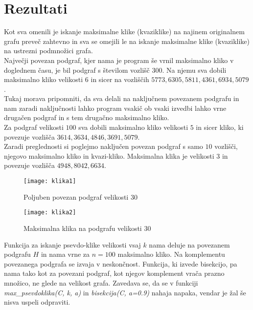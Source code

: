\documentclass[12pt,a4paper]{amsart}
\theoremstyle{definition}
\theoremstyle{plain}
\begin{document}
\section{Rezultati}

Kot sva omenili je iskanje maksimalne klike (kvaziklike) na najinem originalnem grafu preveč zahtevno in sva se omejili le na iskanje maksimalne klike (kvaziklike) na ustrezni podmnožici grafa.\\

Največji povezan podgraf, kjer nama je program še vrnil maksimalno kliko v doglednem času, je bil podgraf s številom vozlišč $300$. Na njemu sva dobili maksimalno kliko velikosti $6$ in sicer na vozliščih $5773, 6305, 5811, 4361, 6934, 5079$ .\\

Tukaj morava pripomniti, da sva delali na naključnem povezanem podgrafu in nam zaradi naključnosti lahko program vsakič ob vsaki izvedbi lahko vrne drugačen podgraf in s tem drugačno maksimalno kliko.\\

Za podgraf velikosti $100$ sva dobili maksimalno kliko velikosti $5$ in sicer kliko, ki povezuje vozlišča $3614, 3634, 4846, 3691, 5079$.\\

Zaradi preglednosti si poglejmo naključen povezan podgraf s samo $10$ vozlišči, njegovo maksimalno kliko in kvazi-kliko.
Maksimalna klika je velikosti $3$ in povezuje vozlišča $4948, 8042, 6634$. 

\begin{figure}[h]
\caption{Poljuben povezan podgraf velikosti 30}
\centering
\texttt{[image: klika1]}
\end{figure}

\begin{figure}[h]
\caption{Maksimalna klika na podgrafu velikosti 30}
\centering
\texttt{[image: klika2]}
\end{figure}

Funkcija za iskanje psevdo-klike velikosti vsaj $k$ nama deluje na povezanem podgrafu $H$ in nama vrne za $n=100$ maksimalno kliko. Na komplementu povezanega podgrafa se izvaja v neskončnost. Funkcija, ki izvede bisekcijo, pa nama tako kot za povezani podgraf, kot njegov komplement vrača prazno množico, ne glede na velikost grafa. Zavedava se, da se v funkciji \textit{max\_psevdoklika(C, k, a)} in \textit{bisekcija(C, a=0.9)} nahaja napaka, vendar je žal še nisva uspeli odpraviti.
\end{document}
